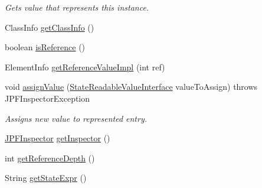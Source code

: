 \begin{DoxyCompactItemize}
\begin{DoxyCompactList}\small\item\em Gets value that represents this instance. \end{DoxyCompactList}\item 
Class\+Info \hyperlink{classgov_1_1nasa_1_1jpf_1_1inspector_1_1server_1_1programstate_1_1_state_value_a493f2e74b201fc3972422974ed7f570e}{get\+Class\+Info} ()
\item 
boolean \hyperlink{classgov_1_1nasa_1_1jpf_1_1inspector_1_1server_1_1programstate_1_1_state_value_ab8084c95fa605147087304bc1f3b3df1}{is\+Reference} ()
\item 
Element\+Info \hyperlink{classgov_1_1nasa_1_1jpf_1_1inspector_1_1server_1_1programstate_1_1_state_value_a4e7c8315bae647ff76504d67299b523c}{get\+Reference\+Value\+Impl} (int ref)
\item 
void \hyperlink{classgov_1_1nasa_1_1jpf_1_1inspector_1_1server_1_1programstate_1_1_state_value_a72f5bb773f88bf20f94de7ab44bbeef0}{assign\+Value} (\hyperlink{interfacegov_1_1nasa_1_1jpf_1_1inspector_1_1server_1_1programstate_1_1_state_readable_value_interface}{State\+Readable\+Value\+Interface} value\+To\+Assign)  throws J\+P\+F\+Inspector\+Exception 
\begin{DoxyCompactList}\small\item\em Assigns new value to represented entry. \end{DoxyCompactList}\item 
\hyperlink{classgov_1_1nasa_1_1jpf_1_1inspector_1_1server_1_1jpf_1_1_j_p_f_inspector}{J\+P\+F\+Inspector} \hyperlink{classgov_1_1nasa_1_1jpf_1_1inspector_1_1server_1_1programstate_1_1_state_node_af07846313e0632df18008b5bf571f805}{get\+Inspector} ()
\item 
int \hyperlink{classgov_1_1nasa_1_1jpf_1_1inspector_1_1server_1_1programstate_1_1_state_node_af59b1ac0319251e657293c810a16cdd9}{get\+Reference\+Depth} ()
\item 
String \hyperlink{classgov_1_1nasa_1_1jpf_1_1inspector_1_1server_1_1programstate_1_1_state_node_a54c1c8d91f93c078171589f844252bdf}{get\+State\+Expr} ()
\end{DoxyCompactItemize}
